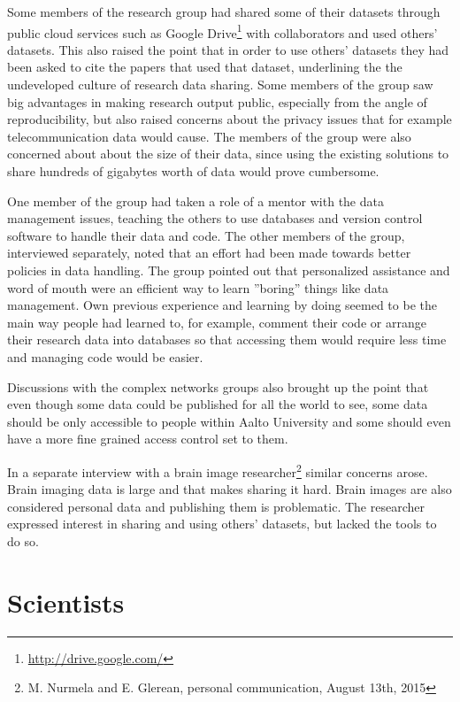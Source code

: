 Some members of the research group had shared some of their datasets through
public cloud services such as Google Drive\footnote{\url{http://drive.google.com/}}
with collaborators and used others' datasets. This also raised the point that
in order to use others' datasets they had been asked to cite the papers that
used that dataset, underlining the the undeveloped culture of research data
sharing. Some members of the group saw big advantages in making research output
public, especially from the angle of reproducibility, but also raised concerns
about the privacy issues that for example telecommunication data would cause.
The members of the group were also concerned about about the size of their
data, since using the existing solutions to share hundreds of gigabytes worth
of data would prove cumbersome.

One member of the group had taken a role of a mentor with the data management
issues, teaching the others to use databases and version control software to
handle their data and code. The other members of the group, interviewed
separately, noted that an effort had been made towards better policies in data
handling. The group pointed out that personalized assistance and word of mouth
were an efficient way to learn ''boring'' things like data management. Own
previous experience and learning by doing seemed to be the main way people had
learned to, for example, comment their code or arrange their research data into
databases so that accessing them would require less time and managing code
would be easier.

Discussions with the complex networks groups also brought up the point that
even though some data could be published for all the world to see, some data
should be only accessible to people within Aalto University and some should
even have a more fine grained access control set to them.

In a separate interview with a brain image researcher\footnote{M. Nurmela and
E. Glerean, personal communication, August 13th, 2015} similar concerns arose.
Brain imaging data is large and that makes sharing it hard. Brain images are
also considered personal data and publishing them is problematic. The
researcher expressed interest in sharing and using others' datasets, but
lacked the tools to do so.

\iffalse
\section{Scientists}

